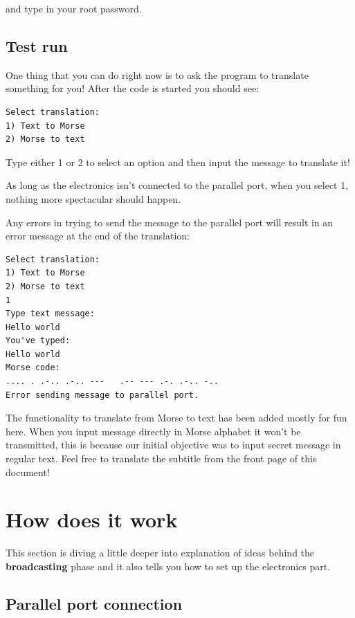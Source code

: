 \documentclass[12pt]{report}
\begin{document}
and type in your root password.

\subsection{Test run}

One thing that you can do right now is to ask the program to translate something for you! After the code is started you should see:

\begin{snugshade}
\begin{verbatim}
Select translation:
1) Text to Morse
2) Morse to text
\end{verbatim}
\end{snugshade}

Type either 1 or 2 to select an option and then input the message to translate it!

As long as the electronics isn't connected to the parallel port, when you select 1, nothing more spectacular should happen.

Any errors in trying to send the message to the parallel port will result in an error message at the end of the translation:

\begin{snugshade}
\begin{verbatim}
Select translation:
1) Text to Morse
2) Morse to text
1
Type text message:
Hello world
You've typed: 
Hello world
Morse code: 
.... . .-.. .-.. ---   .-- --- .-. .-.. -.. 
Error sending message to parallel port.
\end{verbatim}
\end{snugshade}

The functionality to translate from Morse to text has been added mostly for fun here. When you input message directly in Morse alphabet it won't be transmitted, this is because our initial objective was to input secret message in regular text. Feel free to translate the subtitle from the front page of this document!

\section{How does it work}

This section is diving a little deeper into explanation of ideas behind the \textbf{broadcasting} phase and it also tells you how to set up the electronics part.

\subsection{Parallel port connection}
\end{document}
